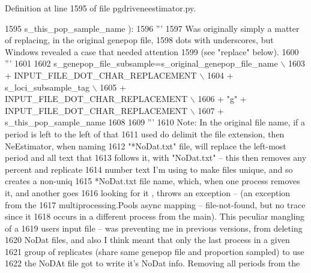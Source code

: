 Definition at line 1595 of file pgdriveneestimator.\+py.


\begin{DoxyCode}
1595                                                     s\_this\_pop\_sample\_name ):
1596     \textcolor{stringliteral}{'''}
1597 \textcolor{stringliteral}{    Was originally simply a matter of replacing, in the original genepop file,}
1598 \textcolor{stringliteral}{    dots with underscores, but Windows revealed a case that needed attention }
1599 \textcolor{stringliteral}{    (see "replace" below).}
1600 \textcolor{stringliteral}{    '''}
1601 
1602     s\_genepop\_file\_subsample=s\_original\_genepop\_file\_name \(\backslash\)
1603                                 + INPUT\_FILE\_DOT\_CHAR\_REPLACEMENT \(\backslash\)
1604                                 +  s\_loci\_subsample\_tag \(\backslash\)
1605                                 + INPUT\_FILE\_DOT\_CHAR\_REPLACEMENT \(\backslash\)
1606                                 + \textcolor{stringliteral}{"g"} + INPUT\_FILE\_DOT\_CHAR\_REPLACEMENT \(\backslash\)
1607                                 + s\_this\_pop\_sample\_name
1608     
1609     \textcolor{stringliteral}{'''}
1610 \textcolor{stringliteral}{    Note: In the original file name, if a period is left to the left of that}
1611 \textcolor{stringliteral}{    used do delimit the file extension, then NeEstimator, when naming}
1612 \textcolor{stringliteral}{    "*NoDat.txt" file, will replace the left-most period and all text that}
1613 \textcolor{stringliteral}{    follows it,  with "NoDat.txt" -- this then removes any percent and replicate}
1614 \textcolor{stringliteral}{    number text I'm using to make files unique, and so creates a non-uniq}
1615 \textcolor{stringliteral}{    *NoDat.txt file name, which, when one process removes it, and another goes}
1616 \textcolor{stringliteral}{    looking for it , throws an exception -- (an exception from the}
1617 \textcolor{stringliteral}{    multiprocessing.Pools async mapping -- file-not-found, but no trace since it}
1618 \textcolor{stringliteral}{    occurs in a different process from the main).  This peculiar mangling of a}
1619 \textcolor{stringliteral}{    users input file -- was preventing me in previous versions, from deleting}
1620 \textcolor{stringliteral}{    NoDat files, and also I think meant that only the last process in a given}
1621 \textcolor{stringliteral}{    group of replicates (share same genepop file and proportion sampled) to use}
1622 \textcolor{stringliteral}{    the NoDAt file got to write it's NoDat info.  Removing all periods from the}

\end{DoxyCode}
